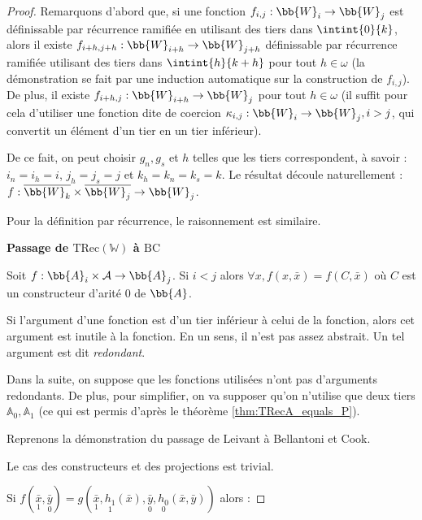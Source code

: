 \documentclass{report}
\newcommand{\bbA}{\mathbb{A}}
\newcommand{\TRec}[1]{\text{TRec}\left(\mathbb{#1}\right)}
\begin{document}
\begin{proof}
			Remarquons d'abord que, si une fonction $f_{i,j} : \bb{W}_i \to \bb{W}_j$ est définissable par récurrence ramifiée en utilisant des tiers dans $\intint{0}{k}$, alors il existe $f_{i+h, j+h} : \bb{W}_{i+h} \to \bb{W}_{j+h}$ définissable par récurrence ramifiée utilisant des tiers dans $\intint{h}{k+h}$ pour tout $h \in \omega$ (la démonstration se fait par une induction automatique sur la construction de $f_{i,j}$). De plus, il existe $f_{i+h,j} : \bb{W}_{i+h} \to \bb{W}_j$ pour tout $h \in \omega$ (il suffit pour cela d'utiliser une fonction dite de coercion $\kappa_{i,j} : \bb{W}_i \to \bb{W}_j, i>j$, qui convertit un élément d'un tier en un tier inférieur).
			
			De ce fait, on peut choisir $g_n, g_s$ et $h$ telles que les tiers correspondent, à savoir : $i_n = i_h = i$, $j_h = j_s = j$ et $k_h = k_n = k_s = k$. Le résultat découle naturellement : $f : \overline{\bb{W}_{k}} \times \overline{\bb{W}_{j}} \to \bb{W}_{j}$.
			
			Pour la définition par récurrence, le raisonnement est similaire. 
			
			\espace
			
			\textbf{Passage de $\TRec{W}$ à $\text{BC}$}
			
			\begin{lemma}
				\label{lem:arg_redondant}
				Soit $f : \bb{A}_i \times \mathcal{A} \to \bb{A}_j$. Si $i < j$ alors $\forall x, f(x, \bar{x}) = f(C, \bar{x})$ où $C$ est un constructeur d'arité $0$ de $\bb{A}$.
			\end{lemma}
			
			Si l'argument d'une fonction est d'un tier inférieur à celui de la fonction, alors cet argument est inutile à la fonction. En un sens, il n'est pas assez abstrait. Un tel argument est dit \emph{redondant}.
			
			Dans la suite, on suppose que les fonctions utilisées n'ont pas d'arguments redondants. De plus, pour simplifier, on va supposer qu'on n'utilise que deux tiers $\bbA_0, \bbA_1$ (ce qui est permis d'après le théorème \ref{thm:TRecA_equals_P}).
			
			Reprenons la démonstration du passage de Leivant à Bellantoni et Cook.
			
			Le cas des constructeurs et des projections est trivial.
			
			Si $f(\underset{1}{\bar{x}}, \underset{0}{\bar{y}}) = g( \underset{1}{\bar{x}}, \underset{1}{h_1}(\bar{x}), \underset{0}{\bar{y}}, \underset{0}{h_0}(\bar{x}, \bar{y}))$ alors :
			

\end{proof}
\end{document}
